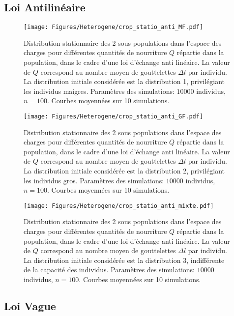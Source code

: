 \pagebreak
\subsection{Loi Antilinéaire}

\begin{figure}[h!]
\centering
\texttt{[image: Figures/Heterogene/crop\_statio\_anti\_MF.pdf]}
\caption{Distribution stationnaire des 2 sous populations dans l'espace des charges pour différentes quantités de nourriture $Q$ répartie dans la population, dans le cadre d'une loi d'échange anti linéaire. La valeur de $Q$ correspond au nombre moyen de gouttelettes $\Delta l$ par individu. La distribution initiale considérée est la distribution 1, privilégiant les individus maigres. Paramètres des simulations: $10000$ individus, $n=100$. Courbes moyennées sur 10 simulations.}
\label{statio_anti_MF}
\end{figure}

\begin{figure}[h!]
\centering
\texttt{[image: Figures/Heterogene/crop\_statio\_anti\_GF.pdf]}
\caption{Distribution stationnaire des 2 sous populations dans l'espace des charges pour différentes quantités de nourriture $Q$ répartie dans la population, dans le cadre d'une loi d'échange anti linéaire. La valeur de $Q$ correspond au nombre moyen de gouttelettes $\Delta l$ par individu. La distribution initiale considérée est la distribution 2, privilégiant les individus gros. Paramètres des simulations: $10000$ individus, $n=100$. Courbes moyennées sur 10 simulations.}
\label{statio_anti_GF}
\end{figure}

\begin{figure}[h!]
\centering
\texttt{[image: Figures/Heterogene/crop\_statio\_anti\_mixte.pdf]}
\caption{Distribution stationnaire des 2 sous populations dans l'espace des charges pour différentes quantités de nourriture $Q$ répartie dans la population, dans le cadre d'une loi d'échange anti linéaire. La valeur de $Q$ correspond au nombre moyen de gouttelettes $\Delta l$ par individu. La distribution initiale considérée est la distribution 3, indifférente de la capacité des individus. Paramètres des simulations: $10000$ individus, $n=100$. Courbes moyennées sur 10 simulations.}
\label{statio_anti_mixte}
\end{figure}

\pagebreak
\subsection{Loi Vague}

